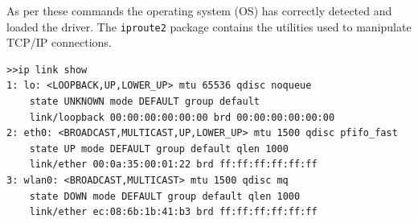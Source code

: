 As per these commands the operating system (OS) has correctly detected and loaded the driver.
The \texttt{iproute2} package contains the utilities used to manipulate TCP/IP connections.
\begin{lstlisting}
>>ip link show
1: lo: <LOOPBACK,UP,LOWER_UP> mtu 65536 qdisc noqueue 
	state UNKNOWN mode DEFAULT group default 
    link/loopback 00:00:00:00:00:00 brd 00:00:00:00:00:00
2: eth0: <BROADCAST,MULTICAST,UP,LOWER_UP> mtu 1500 qdisc pfifo_fast 
	state UP mode DEFAULT group default qlen 1000
    link/ether 00:0a:35:00:01:22 brd ff:ff:ff:ff:ff:ff
3: wlan0: <BROADCAST,MULTICAST> mtu 1500 qdisc mq 
	state DOWN mode DEFAULT group default qlen 1000
    link/ether ec:08:6b:1b:41:b3 brd ff:ff:ff:ff:ff:ff
\end{lstlisting}

